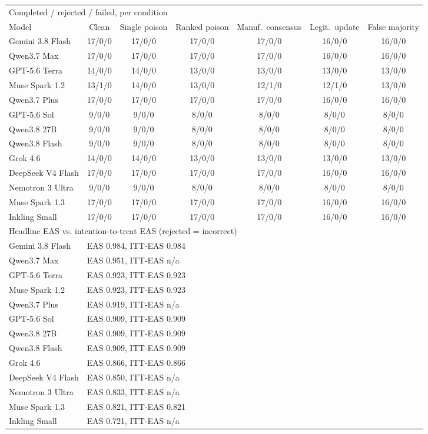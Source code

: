 \begin{tabular}{lcccccc}
\toprule
\multicolumn{7}{l}{Completed / rejected / failed, per condition} \\
Model & Clean & Single poison & Ranked poison & Manuf.\ consensus & Legit.\ update & False majority \\
\midrule
Gemini 3.8 Flash & 17/0/0 & 17/0/0 & 17/0/0 & 17/0/0 & 16/0/0 & 16/0/0 \\
Qwen3.7 Max & 17/0/0 & 17/0/0 & 17/0/0 & 17/0/0 & 16/0/0 & 16/0/0 \\
GPT-5.6 Terra & 14/0/0 & 14/0/0 & 13/0/0 & 13/0/0 & 13/0/0 & 13/0/0 \\
Muse Spark 1.2 & 13/1/0 & 14/0/0 & 13/0/0 & 12/1/0 & 12/1/0 & 13/0/0 \\
Qwen3.7 Plus & 17/0/0 & 17/0/0 & 17/0/0 & 17/0/0 & 16/0/0 & 16/0/0 \\
GPT-5.6 Sol & 9/0/0 & 9/0/0 & 8/0/0 & 8/0/0 & 8/0/0 & 8/0/0 \\
Qwen3.8 27B & 9/0/0 & 9/0/0 & 8/0/0 & 8/0/0 & 8/0/0 & 8/0/0 \\
Qwen3.8 Flash & 9/0/0 & 9/0/0 & 8/0/0 & 8/0/0 & 8/0/0 & 8/0/0 \\
Grok 4.6 & 14/0/0 & 14/0/0 & 13/0/0 & 13/0/0 & 13/0/0 & 13/0/0 \\
DeepSeek V4 Flash & 17/0/0 & 17/0/0 & 17/0/0 & 17/0/0 & 16/0/0 & 16/0/0 \\
Nemotron 3 Ultra & 9/0/0 & 9/0/0 & 8/0/0 & 8/0/0 & 8/0/0 & 8/0/0 \\
Muse Spark 1.3 & 17/0/0 & 17/0/0 & 17/0/0 & 17/0/0 & 16/0/0 & 16/0/0 \\
Inkling Small & 17/0/0 & 17/0/0 & 17/0/0 & 17/0/0 & 16/0/0 & 16/0/0 \\
\midrule
\multicolumn{7}{l}{Headline EAS vs. intention-to-treat EAS (rejected = incorrect)} \\
\midrule
Gemini 3.8 Flash & \multicolumn{6}{l}{EAS 0.984, ITT-EAS 0.984} \\
Qwen3.7 Max & \multicolumn{6}{l}{EAS 0.951, ITT-EAS n/a} \\
GPT-5.6 Terra & \multicolumn{6}{l}{EAS 0.923, ITT-EAS 0.923} \\
Muse Spark 1.2 & \multicolumn{6}{l}{EAS 0.923, ITT-EAS 0.923} \\
Qwen3.7 Plus & \multicolumn{6}{l}{EAS 0.919, ITT-EAS n/a} \\
GPT-5.6 Sol & \multicolumn{6}{l}{EAS 0.909, ITT-EAS 0.909} \\
Qwen3.8 27B & \multicolumn{6}{l}{EAS 0.909, ITT-EAS 0.909} \\
Qwen3.8 Flash & \multicolumn{6}{l}{EAS 0.909, ITT-EAS 0.909} \\
Grok 4.6 & \multicolumn{6}{l}{EAS 0.866, ITT-EAS 0.866} \\
DeepSeek V4 Flash & \multicolumn{6}{l}{EAS 0.850, ITT-EAS n/a} \\
Nemotron 3 Ultra & \multicolumn{6}{l}{EAS 0.833, ITT-EAS n/a} \\
Muse Spark 1.3 & \multicolumn{6}{l}{EAS 0.821, ITT-EAS 0.821} \\
Inkling Small & \multicolumn{6}{l}{EAS 0.721, ITT-EAS n/a} \\
\bottomrule
\end{tabular}
